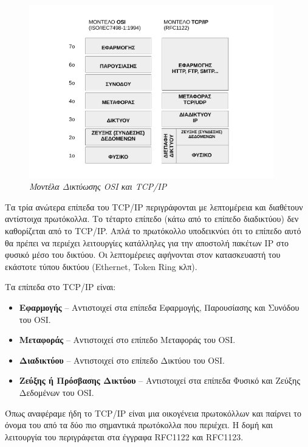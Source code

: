 \begin{figure}[!ht]
  \centering
  \includegraphics[width=0.95\textwidth]{images/chapter1/1-1}
  \caption {\textsl{Μοντέλα Δικτύωσης OSI και TCP/IP}}
  \label{1-1}
\end{figure}

Τα τρία ανώτερα επίπεδα του TCP/IP περιγράφονται με λεπτομέρεια και διαθέτουν αντίστοιχα πρωτόκολλα.
Το τέταρτο επίπεδο (κάτω από το επίπεδο διαδικτύου) δεν καθορίζεται από το TCP/IP. Απλά το πρωτόκολλο
υποδεικνύει ότι το επίπεδο αυτό θα πρέπει να περιέχει λειτουργίες κατάλληλες για την αποστολή πακέτων
IP στο φυσικό μέσο του δικτύου. Οι λεπτομέρειες αφήνονται στον κατασκευαστή του εκάστοτε τύπου δικτύου (Ethernet, Token Ring κλπ).

Τα επίπεδα στο TCP/IP είναι:

\begin{itemize}
\item \textbf{Εφαρμογής} -- Αντιστοιχεί στα επίπεδα Εφαρμογής, Παρουσίασης και Συνόδου του OSI.
\item \textbf{Μεταφοράς} -- Αντιστοιχεί στο επίπεδο Μεταφοράς του OSI.
\item \textbf{Διαδικτύου} -- Αντιστοιχεί στο επίπεδο Δικτύου του OSI.
\item \textbf{Ζεύξης ή Πρόσβασης Δικτύου} -- Αντιστοιχεί στα επίπεδα Φυσικό και Ζεύξης Δεδομένων του OSI.
\end{itemize}

Όπως αναφέραμε ήδη το TCP/IP είναι μια οικογένεια πρωτοκόλλων και παίρνει το όνομα του από τα δύο πιο σημαντικά πρωτόκολλα που περιέχει. Η δομή και λειτουργία του περιγράφεται στα έγγραφα RFC1122 και RFC1123.

